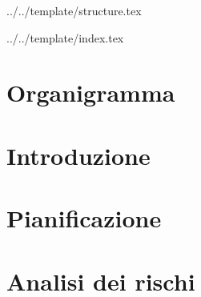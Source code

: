 


\def\DOCUMENTO{Piano di Progetto}
\def\VERSIONE{1.0.0}

\def\DESCRIZIONE{Documento che definisce la pianificazione delle attività del gruppo \GRUPPO{} nello svolgimento del progetto \PROGETTO.}

\def\REDATTORE {Agostinetto Matteo \\ & Burlin Valerio}
\def\VERIFICATORE {Ros Fabio}
\def\RESPONSABILE {Suierica Bogdan}

\def\USO {Esterno}

\def\DISTRIBUZIONE {\GRUPPO{}\\ & \COMMITTENTE{}\\}

\def\DESCRIZIONE {Documento che definisce la pianificazione delle attività del gruppo \GRUPPO{} nello svolgimento del progetto \PROGETTO.}


\def\INDICE	{true}
\def\TABELLE {true}
\def\FIGURE {true}


 {../../template/structure.tex}


 {../../template/index.tex}



%

\section{Organigramma}

\newpage
\section{Introduzione}

\newpage
\section{Pianificazione}

\newpage
\section{Analisi dei rischi}

\newpage


